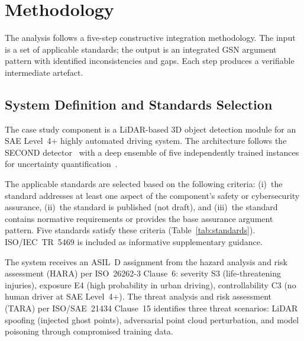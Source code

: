 %

\section{Methodology}\label{sec:methodology}

The analysis follows a five-step constructive integration methodology.
The input is a set of applicable standards; the output is an integrated
GSN argument pattern with identified inconsistencies and gaps.
Each step produces a verifiable intermediate artefact.

\subsection{System Definition and Standards Selection}\label{sec:system-def}

The case study component is a LiDAR-based 3D object detection module for
an SAE Level~4+ highly automated driving system. The architecture follows
the SECOND detector~\cite{Yan2018} with a deep ensemble of five
independently trained instances for uncertainty
quantification~\cite{Lakshminarayanan2017}.

The applicable standards are selected based on the following criteria:
(i)~the standard addresses at least one aspect of the component's safety
or cybersecurity assurance, (ii)~the standard is published (not draft),
and (iii)~the standard contains normative requirements or provides the
base assurance argument pattern. Five standards satisfy these criteria
(Table~\ref{tab:standards}). ISO/IEC~TR~5469 is included as informative
supplementary guidance.

The system receives an ASIL~D assignment from the hazard analysis and
risk assessment (HARA) per ISO~26262-3 Clause~6: severity S3 (life-threatening
injuries), exposure E4 (high probability in urban driving), controllability C3
(no human driver at SAE Level~4+). The threat analysis and risk assessment
(TARA) per ISO/SAE~21434 Clause~15 identifies three threat scenarios:
LiDAR spoofing (injected ghost points), adversarial point cloud perturbation,
and model poisoning through compromised training data.


